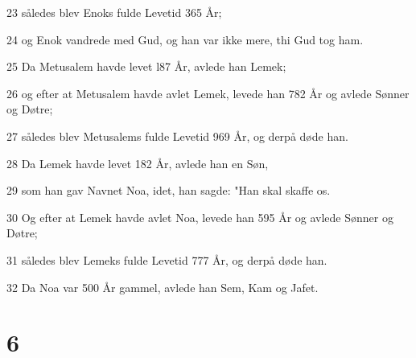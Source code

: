\par 23 således blev Enoks fulde Levetid 365 År;
\par 24 og Enok vandrede med Gud, og han var ikke mere, thi Gud tog ham.
\par 25 Da Metusalem havde levet l87 År, avlede han Lemek;
\par 26 og efter at Metusalem havde avlet Lemek, levede han 782 År og avlede Sønner og Døtre;
\par 27 således blev Metusalems fulde Levetid 969 År, og derpå døde han.
\par 28 Da Lemek havde levet 182 År, avlede han en Søn,
\par 29 som han gav Navnet Noa, idet, han sagde: "Han skal skaffe os.
\par 30 Og efter at Lemek havde avlet Noa, levede han 595 År og avlede Sønner og Døtre;
\par 31 således blev Lemeks fulde Levetid 777 År, og derpå døde han.
\par 32 Da Noa var 500 År gammel, avlede han Sem, Kam og Jafet.

\chapter{6}


